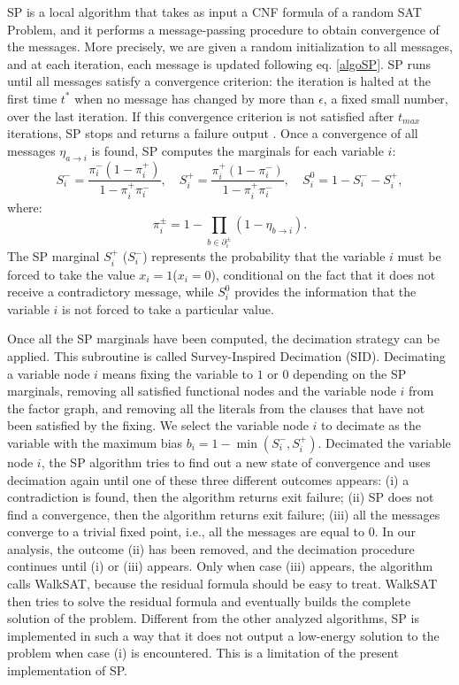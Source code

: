 \documentclass{article}
\begin{document}
SP is a local algorithm that takes as input a CNF formula of a random SAT Problem, and it performs a message-passing procedure to obtain convergence of the messages. More precisely, we are given a random initialization to all messages, and at each iteration, each message is updated following eq. \eqref{algoSP}. SP runs until all messages satisfy a convergence criterion: the iteration is halted at the first time $t^*$ when no message has changed by more than $\epsilon$, a fixed small number, over the last iteration. If this convergence criterion is not satisfied after $t_{max}$ iterations, SP stops and returns a failure output \cite{Marino_2021}. Once a convergence of all messages $\eta_{a \to i}$ is found, SP computes the marginals for each variable $i$:
\begin{equation}
\label{SID}
S_i^-=\frac{\pi_i^-(1-\pi_i^+)}{1-\pi_i^+\pi_i^-},\quad
S_i^+=\frac{\pi_i^+(1-\pi_i^-)}{1-\pi_i^+\pi_i^-},\quad
S_i^0=1-S_i^--S_i^+,
\end{equation}  
where:
\begin{equation}
\pi_i^{\pm}=1-\prod_{b\in \partial_i^{\pm}}(1-\eta_{b \to i}).
\end{equation}
The SP marginal $S_i^{+}$ ($S_i^{-}$) represents the probability that the variable $i$ must be forced to take the value $x_i=1$($x_i=0$), conditional on the fact that it does not receive a contradictory message, while $S_i^{0}$ provides the information that the variable $i$ is not forced to take a particular value. 

Once all the SP marginals have been computed, the decimation strategy can be applied. This subroutine is called Survey-Inspired Decimation (SID). Decimating a variable node $i$ means fixing the variable to $1$ or $0$ depending on the SP marginals, removing all satisfied functional nodes and the variable node $i$ from the factor graph, and removing all the literals from the clauses that have not been satisfied by the fixing. We select the variable node $i$ to decimate as the variable with the maximum bias $b_i=1-\min(S_i^-, S_i^+)$. Decimated the variable node $i$, the SP algorithm tries to find out a new state of convergence and uses decimation again until one of these three different outcomes appears: (i) a contradiction is found, then the algorithm returns exit failure; (ii) SP does not find a convergence, then the algorithm returns exit failure; (iii) all the messages converge to a trivial fixed point, i.e., all the messages are equal to $0$. 
In our analysis, the outcome (ii) has been removed, and the decimation procedure continues until (i) or (iii) appears.
Only when case (iii) appears, the algorithm calls WalkSAT, because the residual formula should be easy to treat. WalkSAT then tries to solve the residual formula and eventually builds the complete solution of the problem.  
Different from the other analyzed algorithms, SP is implemented in such a way that it does not output a low-energy solution to the problem when case (i) is encountered. This is a limitation of the present implementation of SP. 
\end{document}
